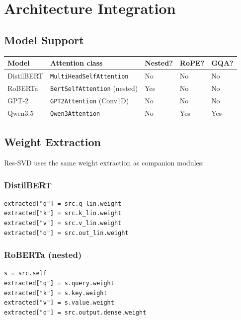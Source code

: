 \section{Architecture Integration}

\subsection{Model Support}

\begin{table}[H]
\centering
\small
\begin{tabular}{lllll}
\toprule
\textbf{Model} & \textbf{Attention class} & \textbf{Nested?} & \textbf{RoPE?} & \textbf{GQA?} \\
\midrule
DistilBERT & \texttt{MultiHeadSelfAttention} & No & No & No \\
RoBERTa & \texttt{BertSelfAttention} (nested) & Yes & No & No \\
GPT-2 & \texttt{GPT2Attention} (Conv1D) & No & No & No \\
Qwen3.5 & \texttt{Qwen3Attention} & No & Yes & Yes \\
\bottomrule
\end{tabular}
\end{table}

\subsection{Weight Extraction}

Res-SVD uses the same weight extraction as companion modules:

\subsubsection{DistilBERT}

\begin{lstlisting}
extracted["q"] = src.q_lin.weight
extracted["k"] = src.k_lin.weight
extracted["v"] = src.v_lin.weight
extracted["o"] = src.out_lin.weight
\end{lstlisting}

\subsubsection{RoBERTa (nested)}

\begin{lstlisting}
s = src.self
extracted["q"] = s.query.weight
extracted["k"] = s.key.weight
extracted["v"] = s.value.weight
extracted["o"] = src.output.dense.weight
\end{lstlisting}

